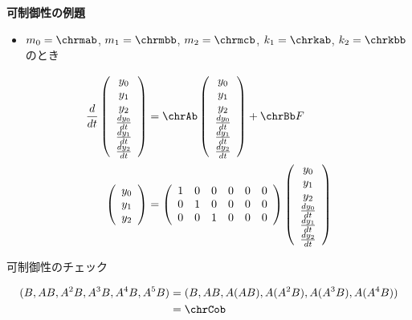 \newpage

\noindent
{\bf 可制御性の例題}

\begin{itemize}
\item $m_0=\chrmab$, $m_1=\chrmbb$, $m_2=\chrmcb$, $k_1=\chrkab$, $k_2=\chrkbb$のとき
\end{itemize}




\begin{align}
 \frac{d}{dt} \statev
 &= \chrAb \statev + \chrBb F
\nonumber
\\
 \left(\begin{array}{c}
	    y_0 \\
		y_1 \\
		y_2
       \end{array}\right)
 &=
 \left(\begin{array}{rrrrrr}
         1 & 0 & 0 & 0 & 0 & 0  \\
         0 & 1 & 0 & 0 & 0 & 0 \\
         0 & 0 & 1 & 0 & 0 & 0 \\
       \end{array}\right)
 \statev
\nonumber
\end{align}

可制御性のチェック

\begin{align}
 (B,AB, A^2B, A^3B, A^4B, A^5B)
 &=
 (B,AB, A(AB), A(A^2B), A(A^3B), A(A^4B))
\nonumber \\
 &=
 \chrCob
\nonumber
\end{align}



